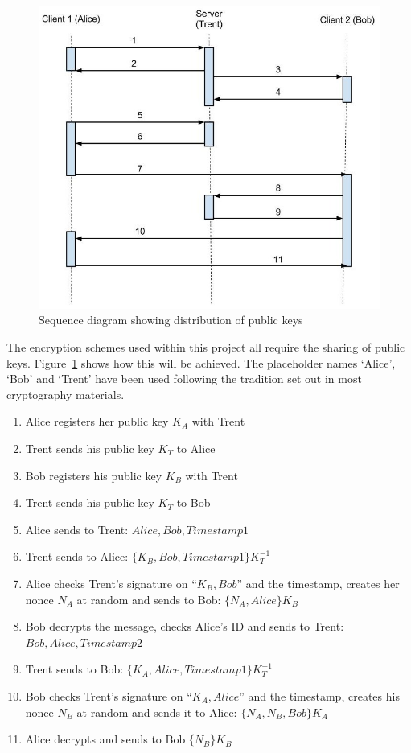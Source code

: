 \documentclass[a4paper,11pt]{article}
\begin{document}
\begin{figure}[htb]
\centering
\includegraphics[scale=0.35]{designs3.jpg}
\caption{Sequence diagram showing distribution of public keys}
\label{fig:designs3}
\end{figure}

The encryption schemes used within this project all require the sharing of public keys. Figure~\ref{fig:designs3} shows how this will be achieved. The placeholder names ‘Alice’, ‘Bob’ and ‘Trent’ have been used following the tradition set out in most cryptography materials.

\begin{enumerate}
  \item Alice registers her public key $ K_{A} $ with Trent
  \item Trent sends his public key $ K_{T} $ to Alice
  \item Bob registers his public key $ K_{B} $ with Trent
  \item Trent sends his public key $ K_{T} $ to Bob
  \item Alice sends to Trent: $ Alice, Bob, Timestamp1 $
  \item Trent sends to Alice: $ \{K_{B},Bob, Timestamp1\} K_{T}^{-1} $
  \item Alice checks Trent’s signature on “$ {K_{B},Bob} $” and the timestamp, creates her nonce $ N_{A} $ at random and sends to Bob: $ \{N_{A} , Alice \}K_{B} $
  \item Bob decrypts the message, checks Alice’s ID and sends to Trent: $ Bob, Alice, Timestamp2 $
  \item Trent sends to Bob: $ \{K_{A} , Alice, Timestamp1\}K_{T}^{-1} $
  \item Bob checks Trent’s signature on “$ K_{A}, Alice $” and the timestamp, creates his nonce $ N_{B} $ at random and sends it to Alice: $ \{N_{A}, N_{B}, Bob\}K_{A} $
  \item Alice decrypts and sends to Bob $ \{N_{B}\}K_{B} $
\end{enumerate}
\end{document}
